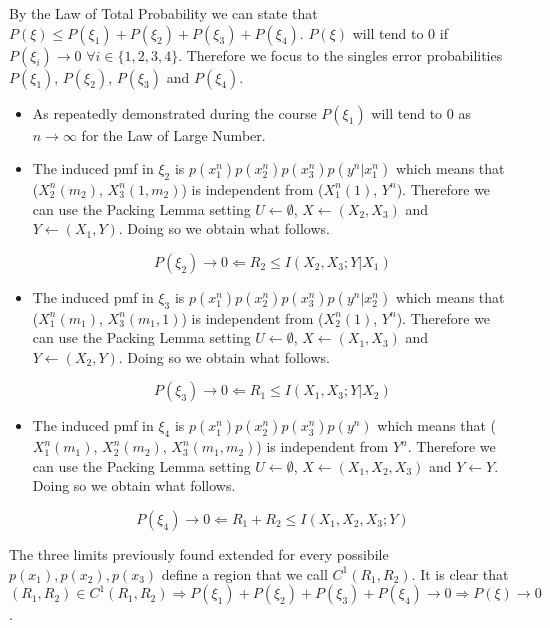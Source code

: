 By the Law of Total Probability we can state that $P(\xi) \leq P(\xi_1) + P(\xi_2) + P(\xi_3) + P(\xi_4) $. $P(\xi)$ will tend to $0$ if $P(\xi_i) \rightarrow 0$ $\forall i \in \{1,2,3,4\}$. Therefore we focus to the singles error probabilities $P(\xi_1)$, $P(\xi_2)$, $P(\xi_3)$ and $P(\xi_4)$.

\begin{itemize}
	\item As repeatedly demonstrated during the course $P(\xi_1)$ will tend to 0 as $n \rightarrow \infty$ for the Law of Large Number.

	\item The induced pmf in $\xi_2$ is $p(x_1^n)p(x_2^n)p(x_3^n)p(y^n|x_1^n)$ which means that ($X_2^n(m_2)$, $X_3^n(1,m_2)$) is independent from ($X_1^n(1)$, $Y^n$). Therefore we can use the Packing Lemma setting $U \leftarrow \emptyset $, $X \leftarrow (X_2,X_3)$ and $Y \leftarrow (X_1,Y)$. Doing so we obtain what follows.

	\begin{equation*}
		P(\xi_2) \rightarrow 0 \Leftarrow R_2 \leq I(X_2,X_3;Y|X_1)
	\end{equation*}

	\item The induced pmf in $\xi_3$ is $p(x_1^n)p(x_2^n)p(x_3^n)p(y^n|x_2^n)$ which means that ($X_1^n(m_1)$, $X_3^n(m_1,1)$) is independent from ($X_2^n(1)$, $Y^n$). Therefore we can use the Packing Lemma setting $U \leftarrow \emptyset $, $X \leftarrow (X_1,X_3)$ and $Y \leftarrow (X_2,Y)$. Doing so we obtain what follows.

	\begin{equation*}
		P(\xi_3) \rightarrow 0 \Leftarrow R_1 \leq I(X_1,X_3;Y|X_2)
	\end{equation*}

	\item The induced pmf in $\xi_4$ is $p(x_1^n)p(x_2^n)p(x_3^n)p(y^n)$ which means that ($X_1^n(m_1)$, $X_2^n(m_2)$, $X_3^n(m_1,m_2)$) is independent from $Y^n$. Therefore we can use the Packing Lemma setting $U \leftarrow \emptyset $, $X \leftarrow (X_1, X_2, X_3)$ and $Y \leftarrow Y$. Doing so we obtain what follows.

	\begin{equation*}
		P(\xi_4) \rightarrow 0 \Leftarrow R_1+R_2 \leq I(X_1,X_2,X_3;Y)
	\end{equation*}
\end{itemize}

The three limits previously found extended for every possibile $p(x_1),p(x_2),p(x_3)$ define a region that we call $C^1(R_1,R_2)$. It is clear that $(R_1,R_2) \in C^1(R_1, R_2) \Rightarrow P(\xi_1) + P(\xi_2) + P(\xi_3) + P(\xi_4) \rightarrow 0 \Rightarrow P(\xi) \rightarrow 0$.

